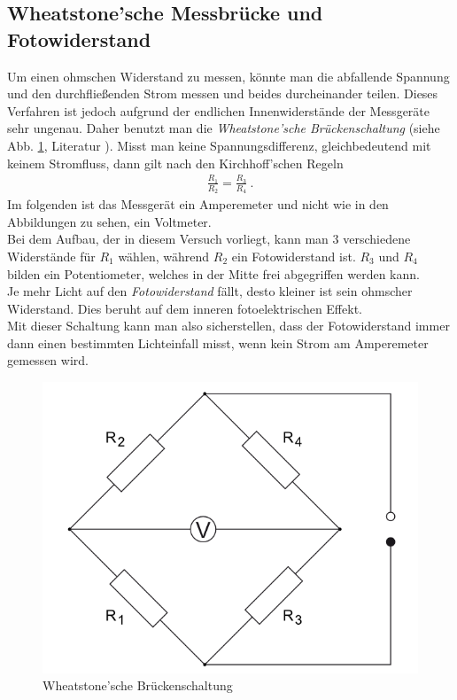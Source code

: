 \documentclass[12pt,a4paper,titlepage,headinclude,bibtotoc]{scrartcl}
\begin{document}
\subsection{Wheatstone'sche Messbrücke und Fotowiderstand}
Um einen ohmschen Widerstand zu messen, könnte man die abfallende Spannung und den durchfließenden Strom  messen und beides durcheinander teilen.
Dieses Verfahren ist jedoch aufgrund der endlichen Innenwiderstände der Messgeräte sehr ungenau.
Daher benutzt man die \textit{Wheatstone'sche Brückenschaltung} (siehe Abb. \ref{fig:bruecke}, Literatur \cite[S.345 f.]{gerthsen}).
Misst man keine Spannungsdifferenz, gleichbedeutend mit keinem Stromfluss, dann gilt nach den Kirchhoff'schen Regeln
\begin{align*}
	\frac{R_1}{R_2}=\frac{R_3}{R_4}~.
\end{align*}
Im folgenden ist das Messgerät ein Amperemeter und nicht wie in den Abbildungen zu sehen, ein Voltmeter.\\
Bei dem Aufbau, der in diesem Versuch vorliegt, kann man 3 verschiedene Widerstände für $R_1$ wählen, während $R_2$ ein Fotowiderstand ist.
$R_3$ und $R_4$ bilden ein Potentiometer, welches in der Mitte frei abgegriffen werden kann.\\
Je mehr Licht auf den \textit{Fotowiderstand} fällt, desto kleiner ist sein ohmscher Widerstand.
Dies beruht auf dem inneren fotoelektrischen Effekt.\\
Mit dieser Schaltung kann man also sicherstellen, dass der Fotowiderstand immer dann einen bestimmten Lichteinfall misst, wenn kein Strom am Amperemeter gemessen wird.

\begin{figure}[!htb]
	\centering	
	\includegraphics[scale=0.6]{Brueckenschaltung.png}
	\caption{Wheatstone'sche Brückenschaltung \cite{lp}}
	\label{fig:bruecke}
\end{figure}
\end{document}
